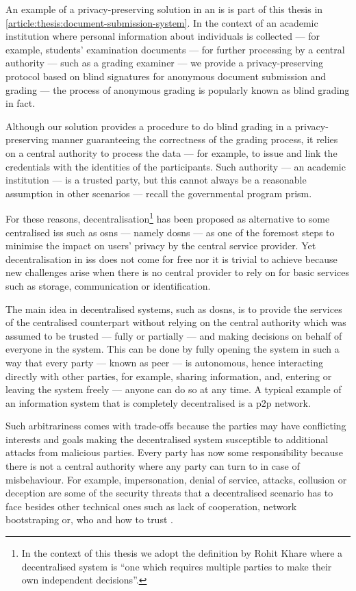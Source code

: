 An example of a privacy-preserving solution in an \ac{is} is part of 
this thesis in \cref{article:thesis:document-submission-system}. In the context of an academic 
institution where personal information about individuals is collected --- for example, 
students' examination documents --- for further processing by a central authority 
--- such as a grading examiner --- we provide a privacy-preserving protocol based 
on blind signatures for anonymous document submission and grading --- the process 
of anonymous grading is popularly known as blind grading in fact. 

Although our solution provides a procedure to do blind grading in a privacy-preserving 
manner guaranteeing the correctness of the grading process, it relies on a central 
authority to process the data --- for example, to issue and link the credentials with 
the identities of the participants. Such authority --- an academic institution --- 
is a trusted party, but this cannot always be a reasonable assumption in other scenarios 
--- recall the governmental program \ac{prism}.

For these reasons, decentralisation\footnote{In the context of this thesis we adopt 
the definition by Rohit Khare where a decentralised system is ``one which requires 
multiple parties to make their own independent decisions''.} has been proposed as 
alternative to some centralised \acp{is} such as \acp{osn} --- namely \acp{dosn} --- 
as one of the foremost steps to minimise the impact on users' privacy by the central 
service provider. Yet decentralisation in \acp{is} does not come for 
free nor it is trivial to achieve because new challenges arise when there is no 
central provider to rely on for basic services such as storage, communication or 
identification.

The main idea in decentralised systems, such as \acp{dosn}, is to provide the services 
of the centralised counterpart without relying on the central authority which was 
assumed to be trusted --- fully or partially --- and making decisions on behalf 
of everyone in the system. This can be done by fully opening the system in such 
a way that every party --- known as peer --- is autonomous, hence interacting directly 
with other parties, for example, sharing information, and, entering or leaving the 
system freely --- anyone can do so at any time. A typical example of an information 
system that is completely decentralised is a \ac{p2p} network.

Such arbitrariness comes with trade-offs because the parties may have conflicting 
interests and goals making the decentralised system susceptible to additional attacks 
from malicious parties. Every party has now some responsibility because there is 
not a central authority where any party can turn to in case of misbehaviour. For 
example, impersonation, denial of service, \Sybil attacks, collusion or deception 
are some of the security threats that a decentralised scenario has to face besides 
other technical ones such as lack of cooperation, network bootstraping or, who and 
how to trust \cite{BucheggerA09}.


